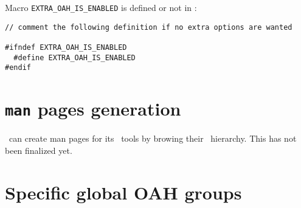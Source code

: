 Macro {\tt EXTRA_OAH_IS_ENABLED} is defined or not in :
\begin{lstlisting}[language=CPlusPlus]
// comment the following definition if no extra options are wanted

#ifndef EXTRA_OAH_IS_ENABLED
  #define EXTRA_OAH_IS_ENABLED
#endif
\end{lstlisting}


%


\section{{\tt man} pages generation}

\mf\ can create man pages for its \CLI\ tools by browing their \oahRepr\ hierarchy. This has not been finalized yet.%


\section{Specific global OAH groups}

